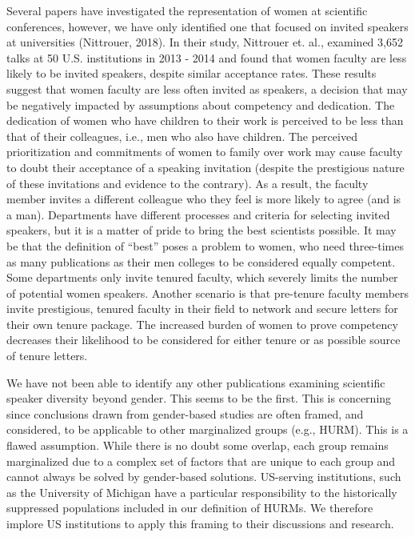 \documentclass[10pt,]{article}
\begin{document}
Several papers have investigated the representation of women at
scientific conferences, however, we have only identified one that
focused on invited speakers at universities (Nittrouer, 2018). In their
study, Nittrouer et. al., examined 3,652 talks at 50 U.S. institutions
in 2013 - 2014 and found that women faculty are less likely to be
invited speakers, despite similar acceptance rates. These results
suggest that women faculty are less often invited as speakers, a
decision that may be negatively impacted by assumptions about competency
and dedication. The dedication of women who have children to their work
is perceived to be less than that of their colleagues, i.e., men who
also have children. The perceived prioritization and commitments of
women to family over work may cause faculty to doubt their acceptance of
a speaking invitation (despite the prestigious nature of these
invitations and evidence to the contrary). As a result, the faculty
member invites a different colleague who they feel is more likely to
agree (and is a man). Departments have different processes and criteria
for selecting invited speakers, but it is a matter of pride to bring the
best scientists possible. It may be that the definition of ``best''
poses a problem to women, who need three-times as many publications as
their men colleges to be considered equally competent. Some departments
only invite tenured faculty, which severely limits the number of
potential women speakers. Another scenario is that pre-tenure faculty
members invite prestigious, tenured faculty in their field to network
and secure letters for their own tenure package. The increased burden of
women to prove competency decreases their likelihood to be considered
for either tenure or as possible source of tenure letters.

We have not been able to identify any other publications examining
scientific speaker diversity beyond gender. This seems to be the first.
This is concerning since conclusions drawn from gender-based studies are
often framed, and considered, to be applicable to other marginalized
groups (e.g., HURM). This is a flawed assumption. While there is no
doubt some overlap, each group remains marginalized due to a complex set
of factors that are unique to each group and cannot always be solved by
gender-based solutions. US-serving institutions, such as the University
of Michigan have a particular responsibility to the historically
suppressed populations included in our definition of HURMs. We therefore
implore US institutions to apply this framing to their discussions and
research.
\end{document}
